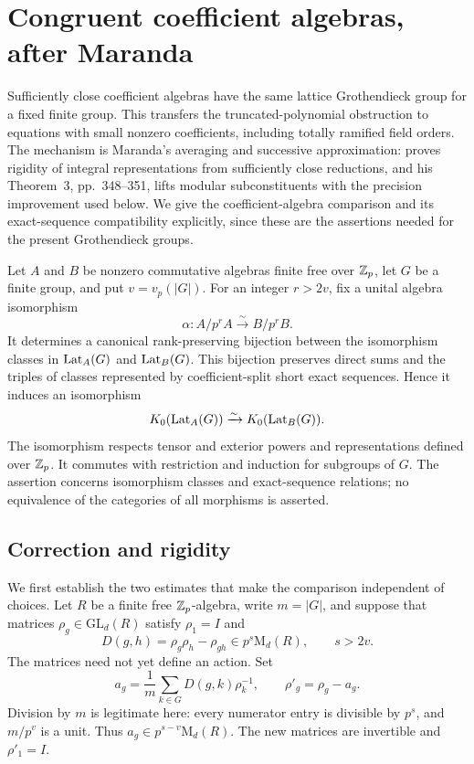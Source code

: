 \section{Congruent coefficient algebras, after Maranda}
\label{sec:congruent-coefficients}

Sufficiently close coefficient algebras have the same lattice
Grothendieck group for a fixed finite group.  This transfers the
truncated-polynomial obstruction to equations with small nonzero
coefficients, including totally ramified field orders.
The mechanism is Maranda's averaging and successive approximation:
\citet[Theorem~2, pp.~347--348]{Maranda1953} proves rigidity of
integral representations from sufficiently close reductions, and
his Theorem~3, pp.~348--351, lifts modular subconstituents with the
precision improvement used below.  We give the coefficient-algebra
comparison and its exact-sequence compatibility explicitly, since
these are the assertions needed for the present Grothendieck groups.

\begin{theorem}\label{thm:congruent-coefficients}
Let $A$ and $B$ be nonzero commutative algebras finite free over
$\mathbb Z_p$, let $G$ be a finite group, and put $v=v_p(|G|)$.
For an integer $r>2v$, fix a unital algebra isomorphism
\[
 \alpha:A/p^rA\xrightarrow{\sim}B/p^rB.
\]
It determines a canonical rank-preserving bijection between the
isomorphism classes in $\operatorname{Lat}_A(G)$ and $\operatorname{Lat}_B(G)$.  This bijection
preserves direct sums and the triples of classes represented by
coefficient-split short exact sequences.  Hence it induces an
isomorphism
\[
 K_0(\operatorname{Lat}_A(G))\xrightarrow{\sim}K_0(\operatorname{Lat}_B(G)).
\]
The isomorphism respects tensor and exterior powers and representations
defined over $\mathbb Z_p$.  It commutes with restriction and induction for
subgroups of $G$.  The assertion concerns isomorphism classes and
exact-sequence relations; no equivalence of the categories of all
morphisms is asserted.
\end{theorem}

\subsection{Correction and rigidity}

We first establish the two estimates that make the comparison
independent of choices.  Let $R$ be a finite free $\mathbb Z_p$-algebra,
write $m=|G|$, and suppose that matrices $\rho_g\in\mathrm{GL}_d(R)$
satisfy $\rho_1=I$ and
\[
 D(g,h)=\rho_g\rho_h-\rho_{gh}\in p^s\mathrm{M}_d(R),
 \qquad s>2v.
\]
The matrices need not yet define an action.  Set
\[
 a_g=\frac1m\sum_{k\in G}D(g,k)\rho_k^{-1},\qquad
 \rho'_g=\rho_g-a_g.
\]
Division by $m$ is legitimate here: every numerator entry is
divisible by $p^s$, and $m/p^v$ is a unit.  Thus
$a_g\in p^{s-v}\mathrm{M}_d(R)$.  The new matrices are invertible
and $\rho'_1=I$.

